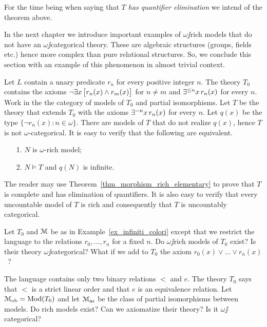 \documentclass[creche.tex]{subfiles}
\begin{document}
For the time being when saying that \textit{$T$ has quantifier elimination\/} we intend  of the theorem above.

In the next chapter we introduce important examples of $\omega\jj$rich models that do not have an $\omega\jj$categorical theory. These are algebraic structures (groups, fields etc.) hence more complex than pure relational structures. So, we conclude this section with an example of this phenomenon in almost trivial context. 

\begin{example}\label{ex_infiniti_colori}
Let $L$ contain a unary predicate $r_n$ for every positive integer $n$. The theory $T_0$ contains the axioms $\neg\exists x\, \big[r_n(x)\wedge r_m(x)\big]$ for $n\neq m$ and $\exists^{\le n}x\,r_n(x)$ for every $n$. Work in the the category of models of $T_0$ and partial isomorphisms. Let $T$ be the theory that extends $T_0$ with the axioms $\exists^{= n} x\, r_n(x)$ for every  $n$. Let $q(x)$ be the type $\big\{\neg r_n(x):n\in\omega\big\}$. There are models of $T$ that do not realize $q(x)$, hence $T$ is not $\omega$-categorical. It is easy to verify that the following are equivalent.
\begin{itemize}
 \item[1.] $N$ is $\omega$-rich model;
 \item[2.] $N\models T$ and  $q(N)$ is infinite.
\end{itemize}
The reader may use Theorem~\ref{thm_morphism_rich_elementary} to prove that $T$ is complete and has elimination of quantifiers. It is also easy to verify that every uncountable model of $T$ is rich and consequently that $T$ is uncountably categorical.\QED
\end{example}


\begin{exercise}\label{ex_finiti_colori}
Let $T_0$ and $\EuScript M$ be as in Example~\ref{ex_infiniti_colori} except that we restrict the language to the relations $r_0,\dots,r_n$ for a fixed $n$. Do $\omega\jj$rich models of $T_0$ exist? Is their theory $\omega\jj$categorical? What if we add to $T_0$ the axiom $r_0(x)\vee\dots\vee r_n(x)$~?\QED
\end{exercise}


\begin{exercise}
The language contains only two binary relations $<$ and $e$. The theory $T_0$ says that $<$ is a strict linear order and that $e$ is an equivalence relation. Let $\EuScript M_{\rm ob}=\mathop{\rm Mod}(T_0)$ and let $\EuScript M_{\rm ar}$  be the class of partial isomorphisms between models.   Do rich models exist? Can we axiomatize their theory? Is it $\omega\jj$categorical?\QED
\end{exercise}
\end{document}
